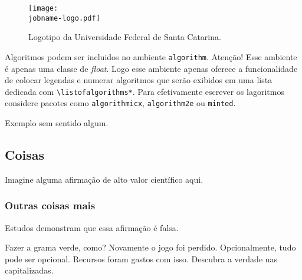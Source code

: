     \begin{figure}[t]
      \centering
      \caption{Logotipo da Universidade Federal de Santa Catarina.}
      \label{fig:logo}
    
      \texttt{[image: \\jobname-logo.pdf]}
    \end{figure}
    
    Algoritmos podem ser incluidos no ambiente \texttt{algorithm}. Atenção! Esse
    ambiente é apenas uma classe de \emph{float}. Logo esse ambiente apenas oferece
    a funcionalidade de colocar legendas e numerar algoritmos que serão exibidos em
    uma lista dedicada com \texttt{\textbackslash{}listofalgorithms*}. Para
    efetivamente escrever os lagoritmos considere pacotes como
    \texttt{algorithmicx}, \texttt{algorithm2e} ou \texttt{minted}.
    
    \begin{algorithm}
      \centering
      \caption{Exemplo sem sentido algum.}
    
    
    \end{algorithm}
    
    \subsection{Coisas}
    \label{sec:stuff}
    Imagine alguma afirmação de alto valor científico aqui.
    
    \subsubsection{Outras coisas mais}
    \label{sec:other}
    Estudos demonstram que essa afirmação é falsa.
    
    \label{sec:yet-another}
    Fazer a grama verde, como? Novamente o jogo foi perdido. Opcionalmente, tudo
    pode ser opcional. Recursos foram gastos com isso. Descubra a verdade nas
    capitalizadas.
